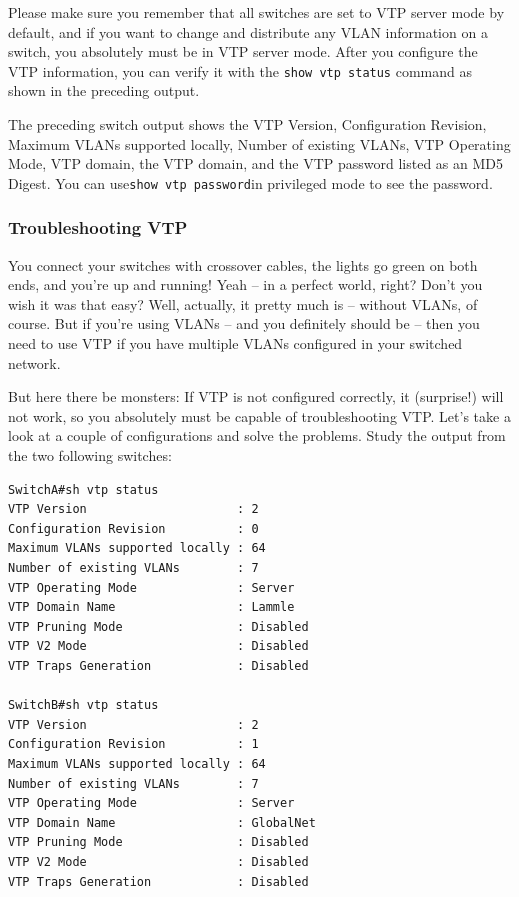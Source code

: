 Please make sure you remember that all switches are set to VTP server
mode by default, and if you want to change and distribute any VLAN
information on a switch, you absolutely must be in VTP server mode.
After you configure the VTP information, you can verify it with the
\texttt{show\ vtp\ status} command as shown in the preceding output.

The preceding switch output shows the VTP Version, Configuration
Revision, Maximum VLANs supported locally, Number of existing VLANs, VTP
Operating Mode, VTP domain, the VTP domain, and the VTP password listed
as an MD5 Digest. You can use\texttt{show\ vtp\ password}in privileged
mode to see the password.

\subsubsection[Troubleshooting
VTP]{\texorpdfstring{\protect\hypertarget{c15.xhtmlux5cux23c15-sec-8}{}{}Troubleshooting
VTP}{Troubleshooting VTP}}

You connect your switches with crossover cables, the lights go green on
both ends, and you're up and running! Yeah -- in a perfect world, right?
Don't you wish it was that easy? Well, actually, it pretty much
is -- without VLANs, of course. But if you're using VLANs -- and you
definitely should be -- then you need to use VTP if you have multiple
VLANs configured in your switched network.

But here there be monsters: If VTP is not configured correctly, it
(surprise!) will not work, so you absolutely must be capable of
troubleshooting VTP. Let's take a look at a couple of configurations and
solve the problems. Study the output from the two following switches:

\begin{verbatim}
SwitchA#sh vtp status
VTP Version                     : 2
Configuration Revision          : 0
Maximum VLANs supported locally : 64
Number of existing VLANs        : 7
VTP Operating Mode              : Server
VTP Domain Name                 : Lammle
VTP Pruning Mode                : Disabled
VTP V2 Mode                     : Disabled
VTP Traps Generation            : Disabled
 
SwitchB#sh vtp status
VTP Version                     : 2
Configuration Revision          : 1
Maximum VLANs supported locally : 64
Number of existing VLANs        : 7
VTP Operating Mode              : Server
VTP Domain Name                 : GlobalNet
VTP Pruning Mode                : Disabled
VTP V2 Mode                     : Disabled
VTP Traps Generation            : Disabled
\end{verbatim}

